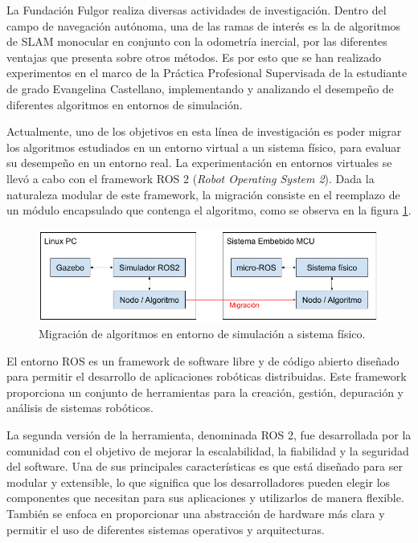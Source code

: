 \documentclass[
11pt, %
codirector, %
]{charter}
\begin{document}
La Fundación Fulgor realiza diversas actividades de investigación. Dentro del campo de navegación autónoma, una de las ramas de interés es la de algoritmos de SLAM monocular en conjunto con la odometría inercial, por las diferentes ventajas que presenta sobre otros métodos. Es por esto que se han realizado experimentos en el marco de la Práctica Profesional Supervisada de la estudiante de grado Evangelina Castellano, implementando y analizando el desempeño de diferentes algoritmos en entornos de simulación.

Actualmente, uno de los objetivos en esta línea de investigación es poder migrar los algoritmos estudiados en un entorno virtual a un sistema físico, para evaluar su desempeño en un entorno real. La experimentación en entornos virtuales se llevó a cabo con el framework ROS 2 (\textit{Robot Operating System 2}).
Dada la naturaleza modular de este framework, la migración consiste en el reemplazo de un módulo encapsulado que contenga el algoritmo, como se observa en la figura \ref{fig:ros2-to-microros}. 

\begin{figure}[htpb]
\centering 
\includegraphics[width=.8\textwidth]{./imgs/ros2-microros-migration.png}
\caption{Migración de algoritmos en entorno de simulación a sistema físico.}
\label{fig:ros2-to-microros}
\end{figure}


El entorno ROS es un framework de software libre y de código abierto diseñado para permitir el desarrollo de aplicaciones robóticas distribuidas. Este framework proporciona un conjunto de herramientas para la creación, gestión, depuración y análisis de sistemas robóticos.

La segunda versión de la herramienta, denominada ROS 2, fue desarrollada por la comunidad con el objetivo de mejorar la escalabilidad, la fiabilidad y la seguridad del software.
Una de sus principales características es que está diseñado para ser modular y extensible, lo que significa que los desarrolladores pueden elegir los componentes que necesitan para sus aplicaciones y utilizarlos de manera flexible. 
También se enfoca en proporcionar una abstracción de hardware más clara y permitir el uso de diferentes sistemas operativos y arquitecturas. 
\end{document}
